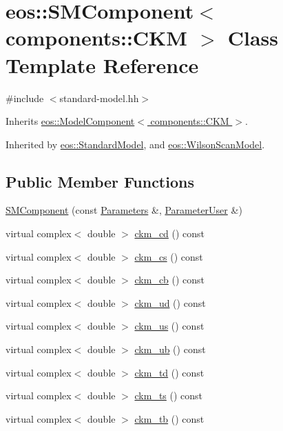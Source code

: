 \hypertarget{classeos_1_1SMComponent_3_01components_1_1CKM_01_4}{
\section{eos::SMComponent$<$ components::CKM $>$ Class Template Reference}
\label{classeos_1_1SMComponent_3_01components_1_1CKM_01_4}
}


{\ttfamily \#include $<$standard-\/model.hh$>$}

Inherits \hyperlink{classeos_1_1ModelComponent_3_01components_1_1CKM_01_4}{eos::ModelComponent$<$ components::CKM $>$}.

Inherited by \hyperlink{classeos_1_1StandardModel}{eos::StandardModel}, and \hyperlink{classeos_1_1WilsonScanModel}{eos::WilsonScanModel}.\subsection*{Public Member Functions}
\begin{DoxyCompactItemize}
\item 
\hyperlink{classeos_1_1SMComponent_3_01components_1_1CKM_01_4_a89937ea05211033cd7365fc9a026f276}{SMComponent} (const \hyperlink{classeos_1_1Parameters}{Parameters} \&, \hyperlink{classeos_1_1ParameterUser}{ParameterUser} \&)
\item 
virtual complex$<$ double $>$ \hyperlink{classeos_1_1SMComponent_3_01components_1_1CKM_01_4_a9ed875717a5f63d01efb163f951f5149}{ckm\_\-cd} () const 
\item 
virtual complex$<$ double $>$ \hyperlink{classeos_1_1SMComponent_3_01components_1_1CKM_01_4_a6bea3d64797260948d80302c11b5a6c1}{ckm\_\-cs} () const 
\item 
virtual complex$<$ double $>$ \hyperlink{classeos_1_1SMComponent_3_01components_1_1CKM_01_4_a001e9ea6af4bcd20dde06bf894d3cbb5}{ckm\_\-cb} () const 
\item 
virtual complex$<$ double $>$ \hyperlink{classeos_1_1SMComponent_3_01components_1_1CKM_01_4_a850dc3770b53e2cf3e8cfeb466ee311e}{ckm\_\-ud} () const 
\item 
virtual complex$<$ double $>$ \hyperlink{classeos_1_1SMComponent_3_01components_1_1CKM_01_4_a4dcb7f6ada6e03fd3810c4c98c9cffa8}{ckm\_\-us} () const 
\item 
virtual complex$<$ double $>$ \hyperlink{classeos_1_1SMComponent_3_01components_1_1CKM_01_4_a8f787b6796f087fb64d1349c564fd72d}{ckm\_\-ub} () const 
\item 
virtual complex$<$ double $>$ \hyperlink{classeos_1_1SMComponent_3_01components_1_1CKM_01_4_a5962bd89ee4206447b52dfe2d503e9fb}{ckm\_\-td} () const 
\item 
virtual complex$<$ double $>$ \hyperlink{classeos_1_1SMComponent_3_01components_1_1CKM_01_4_a8b1562be6dd88747f3a0cb59c1679d8e}{ckm\_\-ts} () const 
\item 
virtual complex$<$ double $>$ \hyperlink{classeos_1_1SMComponent_3_01components_1_1CKM_01_4_afb95652fde6ce0bdd7a3b67db4b4ecf4}{ckm\_\-tb} () const 
\end{DoxyCompactItemize}
